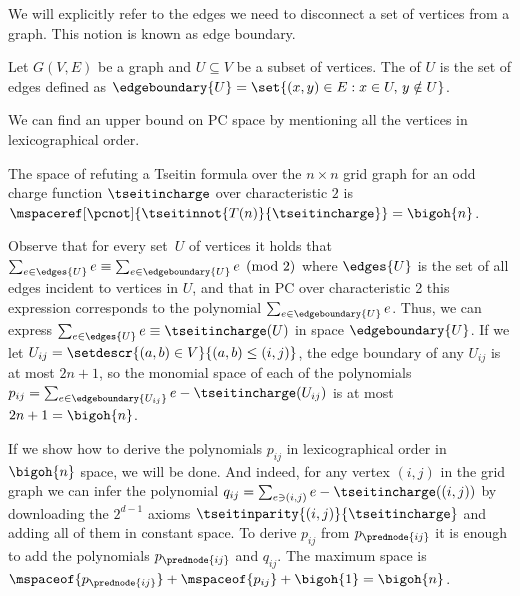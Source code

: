 \documentclass{toc}
\begin{document}
We will explicitly refer to the edges we need to disconnect a set of vertices from a graph. This notion is known as edge boundary.
\begin{definition}
  \label{def:edge-boundary}
  Let $G(V,E)$ be a graph and $U\subseteq V$ be a subset of vertices. The  of $U$ is the set of edges
  defined as %
  $\edgeboundary{U}=\set{(x,y)\in E : x\in U,\,y\notin U}$.
\end{definition}

We can find an upper bound on PC space by mentioning all the vertices in lexicographical order.

\begin{lemma}
  The space of refuting a Tseitin formula over the $n\times n$ grid graph for an odd charge function $\tseitincharge$ over characteristic $2$ is $\mspaceref[\pcnot]{\tseitinnot{T(n)}{\tseitincharge}}=\bigoh{n}$.
\end{lemma}
\begin{ourproof}[sketch]
  Observe that for every %
  set~$U$ of vertices
  it holds that $\sum_{e \in \edges{U}} e \equiv \sum_{e \in \edgeboundary{U}}e \pmod{2}$ where $\edges{U}$ is the set of all edges incident to vertices in $U$, and that in PC over characteristic 2 this expression corresponds to the polynomial $\sum_{e \in \edgeboundary{U}}e$. Thus, we can express $\sum_{e \in \edges{U}} e \equiv \tseitincharge(U)$ in space $\edgeboundary{U}$. If we let $U_{ij}=\setdescr{(a,b)\in V}{(a,b)\leq (i,j)}$, the edge boundary of any $U_{ij}$ is at most $2n+1$, so the monomial space of each of the polynomials $p_{ij}=\sum_{e \in \edgeboundary{U_{ij}}}e-\tseitincharge(U_{ij})$ is at most $2n+1=\bigoh{n}$.

  If we show how to derive the polynomials $p_{ij}$ in lexicographical order in $\bigoh{n}$ space, we will be done. And indeed, for any vertex $(i,j)$ in the grid graph we can infer the polynomial $q_{ij}=\sum_{e\ni (i,j)}e-\tseitincharge((i, j))$ by downloading the $2^{d-1}$ axioms $\tseitinparity{(i,j)}{\tseitincharge}$ and adding all of them in constant space. To derive $p_{ij}$ from $p_{\prednode{ij}}$ it is enough to add the polynomials $p_{\prednode{ij}}$ and $q_{ij}$. The maximum space is $\mspaceof{p_{\prednode{ij}}}+\mspaceof{p_{ij}}+\bigoh{1}=\bigoh{n}$.
\end{ourproof}
\end{document}
